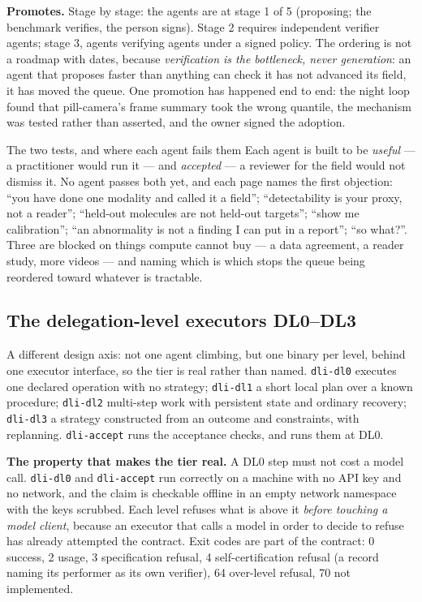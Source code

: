 \textbf{Promotes.} Stage by stage: the agents are at stage 1 of 5 (proposing; the benchmark verifies, the person signs). Stage 2 requires independent verifier agents; stage 3, agents verifying agents under a signed policy. The ordering is not a roadmap with dates, because \emph{verification is the bottleneck, never generation}: an agent that proposes faster than anything can check it has not advanced its field, it has moved the queue. One promotion has happened end to end: the night loop found that pill-camera's frame summary took the wrong quantile, the mechanism was tested rather than asserted, and the owner signed the adoption.

\begin{claimbox}{The two tests, and where each agent fails them}
Each agent is built to be \emph{useful} --- a practitioner would run it --- and \emph{accepted} --- a reviewer for the field would not dismiss it. No agent passes both yet, and each page names the first objection: ``you have done one modality and called it a field''; ``detectability is your proxy, not a reader''; ``held-out molecules are not held-out targets''; ``show me calibration''; ``an abnormality is not a finding I can put in a report''; ``so what?''. Three are blocked on things compute cannot buy --- a data agreement, a reader study, more videos --- and naming which is which stops the queue being reordered toward whatever is tractable.
\end{claimbox}

\subsection{The delegation-level executors DL0--DL3}\label{sec:dl}

A different design axis: not one agent climbing, but one binary per level, behind one executor interface, so the tier is real rather than named. \texttt{dli-dl0} executes one declared operation with no strategy; \texttt{dli-dl1} a short local plan over a known procedure; \texttt{dli-dl2} multi-step work with persistent state and ordinary recovery; \texttt{dli-dl3} a strategy constructed from an outcome and constraints, with replanning. \texttt{dli-accept} runs the acceptance checks, and runs them at DL0.

\textbf{The property that makes the tier real.} A DL0 step must not cost a model call. \texttt{dli-dl0} and \texttt{dli-accept} run correctly on a machine with no API key and no network, and the claim is checkable offline in an empty network namespace with the keys scrubbed. Each level refuses what is above it \emph{before touching a model client}, because an executor that calls a model in order to decide to refuse has already attempted the contract. Exit codes are part of the contract: 0 success, 2 usage, 3 specification refusal, 4 self-certification refusal (a record naming its performer as its own verifier), 64 over-level refusal, 70 not implemented.

